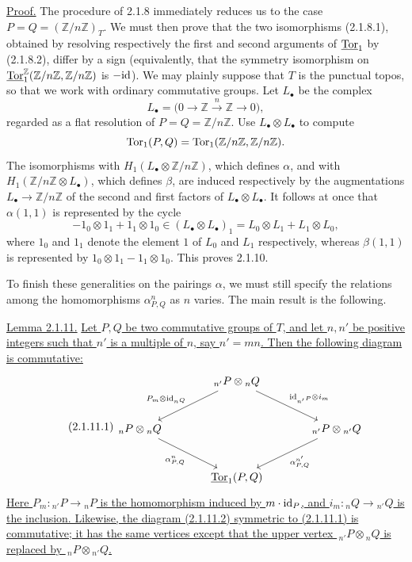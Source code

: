 \medskip
\noindent\underline{Proof.}
The procedure of 2.1.8 immediately reduces us to the case
$P=Q=(\mathbb Z/n\mathbb Z)_T$.  We must then prove that the two
isomorphisms (2.1.8.1), obtained by resolving respectively the first
and second arguments of $\uTor_1$ by (2.1.8.2), differ by a sign
(equivalently, that the symmetry isomorphism on
$\uTor^{\mathbb Z}_1(\mathbb Z/n\mathbb Z,\mathbb Z/n\mathbb Z)$ is
$-\mathrm{id}$).  We may plainly suppose that $T$ is the punctual topos, so
that we work with ordinary commutative groups.  Let $L_\bullet$ be the
complex
\[
 L_\bullet=\bigl(0\longrightarrow\mathbb Z
 \xrightarrow{n}\mathbb Z\longrightarrow0\bigr),
\]
regarded as a flat resolution of
$P=Q=\mathbb Z/n\mathbb Z$.  Use
$L_\bullet\otimes L_\bullet$ to compute
\[
 \operatorname{Tor}_1(P,Q)=\operatorname{Tor}_1(\mathbb Z/n\mathbb Z,\mathbb Z/n\mathbb Z).
\]
The isomorphisms with
$H_1(L_\bullet\otimes\mathbb Z/n\mathbb Z)$, which defines $\alpha$,
and with
$H_1(\mathbb Z/n\mathbb Z\otimes L_\bullet)$, which defines $\beta$,
are induced respectively by the augmentations
$L_\bullet\longrightarrow\mathbb Z/n\mathbb Z$ of the second and
first factors of $L_\bullet\otimes L_\bullet$.  It follows at once
that $\alpha(1,1)$ is represented by the cycle
\[
 -1_0\otimes1_1+1_1\otimes1_0
 \in(L_\bullet\otimes L_\bullet)_1
 =L_0\otimes L_1+L_1\otimes L_0,
\]
where $1_0$ and $1_1$ denote the element $1$ of $L_0$ and $L_1$
respectively, whereas $\beta(1,1)$ is represented by
$1_0\otimes1_1-1_1\otimes1_0$.  This proves 2.1.10.

To finish these generalities on the pairings $\alpha$, we must still
specify the relations among the homomorphisms $\alpha^n_{P,Q}$ as
$n$ varies.  The main result is the following.

\medskip
\noindent\underline{Lemma 2.1.11.}
\underline{Let $P,Q$ be two commutative groups of $T$, and let $n,n'$
be positive integers such that $n'$ is a multiple of $n$, say
$n'=mn$.  Then the following diagram is commutative:}
\begin{equation}\tag{2.1.11.1}
\begin{tikzcd}[column sep=large,row sep=large]
 &{}_{n'}P\otimes{}_nQ
   \arrow[ld,"P_m\otimes\id_{{}_nQ}"']
   \arrow[rd,"\id_{{}_{n'}P}\otimes i_m"]&\\
 {}_nP\otimes{}_nQ
   \arrow[rd,"{\alpha^n_{P,Q}}"']&&
 {}_{n'}P\otimes{}_{n'}Q
   \arrow[ld,"{\alpha^{n'}_{P,Q}}"]\\
 &\uTor_1(P,Q)&
\end{tikzcd}
\end{equation}
\underline{Here $P_m:{}_{n'}P\longrightarrow{}_nP$ is the homomorphism
induced by $m\cdot\mathrm{id}_P$, and
$i_m:{}_nQ\longrightarrow{}_{n'}Q$ is the inclusion.  Likewise, the
diagram (2.1.11.2) symmetric to (2.1.11.1) is commutative; it has the
same vertices except that the upper vertex
$\,{}_{n'}P\otimes{}_nQ$ is replaced by
$\,{}_nP\otimes{}_{n'}Q$.}


